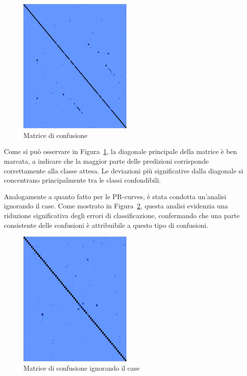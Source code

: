 \begin{figure}[htbp]
    \centering
    \includegraphics[width=0.5\textwidth]{images/confusion_matrix.png}
    \caption{Matrice di confusione}
    \label{fig:confusion_matrix}
\end{figure}

Come si può osservare in Figura~\ref{fig:confusion_matrix}, la diagonale principale della matrice è ben marcata, a indicare che la maggior parte delle predizioni corrisponde correttamente alla classe attesa. Le deviazioni più significative dalla diagonale si concentrano principalmente tra le classi confondibili.

Analogamente a quanto fatto per le PR-curves, è stata condotta un'analisi ignorando il case. Come mostrato in Figura~\ref{fig:confusion_matrix_case_insensitive}, questa analisi evidenzia una riduzione significativa degli errori di classificazione, confermando che una parte consistente delle confusioni è attribuibile a questo tipo di confusioni.

\begin{figure}[htbp]
    \centering
    \includegraphics[width=0.5\textwidth]{images/confusion_matrix_case.png}
    \caption{Matrice di confusione ignorando il case}
    \label{fig:confusion_matrix_case_insensitive}
\end{figure}


